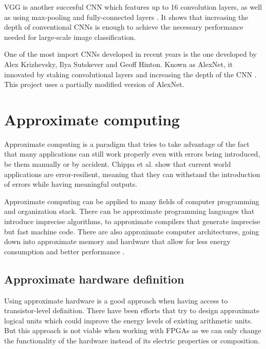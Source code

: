 VGG is another succesful CNN which features up to 16 convolution layers, as well
as using max-pooling and fully-connected layers \cite{simonyan2014very}. It shows
that increasing the depth of conventional CNNs is enough to achieve the necessary
performance needed for large-scale image classification.

One of the most import CNNs developed in recent years is the one developed by 
Alex Krizhevsky, Ilya Sutskever and Geoff Hinton. Known as AlexNet, it innovated
by staking convolutional layers and increasing the depth of the CNN \cite{krizhevsky2012imagenet}. 
This project uses a partially modified version of AlexNet.


\section{Approximate computing}

Approximate computing is a paradigm that tries to take advantage of the fact that
many applications can still work properly even with errors being introduced, be them
manually or by accident. Chippa et al. \cite{chippa2013analysis} show that current world
applications are error-resilient, meaning that they can withstand the introduction of errors
while having meaningful outputs.

Approximate computing can be applied to many fields of computer programming and organization stack.
There can be approximate programming languages that introduce imprecise algorithms, 
to approximate compilers that generate imprecise but fast machine code.
There are also approximate computer architectures, going down into approximate memory and hardware that allow for 
less energy consumption and better performance \cite{surveyqu}.

\subsection{Approximate hardware definition}

Using approximate hardware is a good approach when having access to transistor-level definition.
There have been efforts that try to design approximate logical units \cite{kim2013energy}\cite{ye2013reconfiguration}
which could improve the energy levels of existing arithmetic units. But this approach is 
not viable when working with FPGAs as we can only change the functionality of the hardware
instead of its electric properties or composition.

